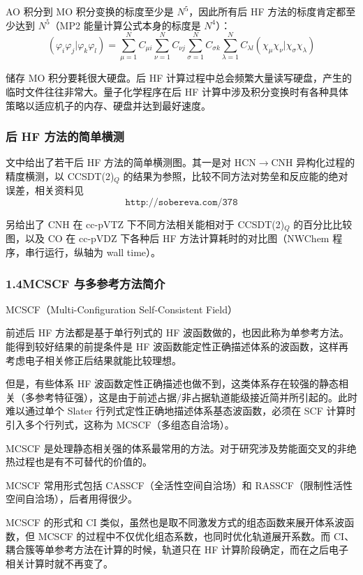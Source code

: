 AO 积分到 MO 积分变换的标度至少是 $N^5$，因此所有后 HF 方法的标度肯定都至少达到 $N^5$（MP2 能量计算公式本身的标度是 $N^4$）：
\[
(\varphi_i\varphi_j|\varphi_k\varphi_l)
=
\sum_{\mu=1}^N C_{\mu i}
\sum_{\nu=1}^N C_{\nu j}
\sum_{\sigma=1}^N C_{\sigma k}
\sum_{\lambda=1}^N C_{\lambda l}
(\chi_\mu\chi_\nu|\chi_\sigma\chi_\lambda)
\]

储存 MO 积分要耗很大硬盘。后 HF 计算过程中总会频繁大量读写硬盘，产生的临时文件往往非常大。量子化学程序在后 HF 计算中涉及积分变换时有各种具体策略以适应机子的内存、硬盘并达到最好速度。

\subsubsection*{后 HF 方法的简单横测}

文中给出了若干后 HF 方法的简单横测图。其一是对 HCN$\to$CNH 异构化过程的精度横测，以 CCSDT(2)$_Q$ 的结果为参照，比较不同方法对势垒和反应能的绝对误差，相关资料见
\[
\texttt{http://sobereva.com/378}
\]

另给出了 CNH 在 cc-pVTZ 下不同方法相关能相对于 CCSDT(2)$_Q$ 的百分比比较图，以及 CO 在 cc-pVDZ 下各种后 HF 方法计算耗时的对比图（NWChem 程序，串行运行，纵轴为 wall time）。

\subsubsection*{1.4\quad MCSCF 与多参考方法简介}

MCSCF（Multi-Configuration Self-Consistent Field）

前述后 HF 方法都是基于单行列式的 HF 波函数做的，也因此称为单参考方法。能得到较好结果的前提条件是 HF 波函数能定性正确描述体系的波函数，这样再考虑电子相关修正后结果就能比较理想。

但是，有些体系 HF 波函数定性正确描述也做不到，这类体系存在较强的静态相关（多参考特征强），这是由于前述占据/非占据轨道能级接近简并所引起的。此时难以通过单个 Slater 行列式定性正确地描述体系基态波函数，必须在 SCF 计算时引入多个行列式，这称为 MCSCF（多组态自洽场）。

MCSCF 是处理静态相关强的体系最常用的方法。对于研究涉及势能面交叉的非绝热过程也是有不可替代的价值的。

MCSCF 常用形式包括 CASSCF（全活性空间自洽场）和 RASSCF（限制性活性空间自洽场），后者用得很少。

MCSCF 的形式和 CI 类似，虽然也是取不同激发方式的组态函数来展开体系波函数，但 MCSCF 的过程中不仅优化组态系数，也同时优化轨道展开系数。而 CI、耦合簇等单参考方法在计算的时候，轨道只在 HF 计算阶段确定，而在之后电子相关计算时就不再变了。

